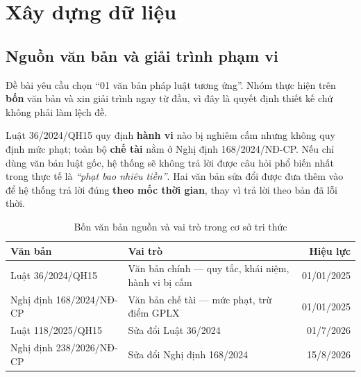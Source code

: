 \section{Xây dựng dữ liệu}
\label{sec:du-lieu}

\subsection{Nguồn văn bản và giải trình phạm vi}

Đề bài yêu cầu chọn ``01 văn bản pháp luật tương ứng''. Nhóm thực hiện trên \textbf{bốn}
văn bản và xin giải trình ngay từ đầu, vì đây là quyết định thiết kế chứ không phải làm
lệch đề.

\begin{keybox}
Luật 36/2024/QH15 quy định \textbf{hành vi} nào bị nghiêm cấm nhưng không quy định mức phạt;
toàn bộ \textbf{chế tài} nằm ở Nghị định 168/2024/NĐ-CP. Nếu chỉ dùng văn bản luật gốc, hệ
thống sẽ không trả lời được câu hỏi phổ biến nhất trong thực tế là \emph{``phạt bao nhiêu
tiền''}. Hai văn bản sửa đổi được đưa thêm vào để hệ thống trả lời đúng \textbf{theo mốc thời
gian}, thay vì trả lời theo bản đã lỗi thời.
\end{keybox}

\begin{table}[H]
\centering
\caption{Bốn văn bản nguồn và vai trò trong cơ sở tri thức}
\label{tab:van-ban}
\renewcommand{\arraystretch}{1.2}
\begin{tabularx}{\textwidth}{@{}l L r@{}}
\toprule
\textbf{Văn bản} & \textbf{Vai trò} & \textbf{Hiệu lực} \\
\midrule
Luật 36/2024/QH15~\cite{luat36}        & Văn bản chính --- quy tắc, khái niệm, hành vi bị cấm & 01/01/2025 \\
Nghị định 168/2024/NĐ-CP~\cite{nd168}  & Văn bản chế tài --- mức phạt, trừ điểm GPLX          & 01/01/2025 \\
Luật 118/2025/QH15~\cite{luat118}      & Sửa đổi Luật 36/2024                                  & 01/7/2026 \\
Nghị định 238/2026/NĐ-CP~\cite{nd238}  & Sửa đổi Nghị định 168/2024                            & 15/8/2026 \\
\bottomrule
\end{tabularx}
\end{table}

